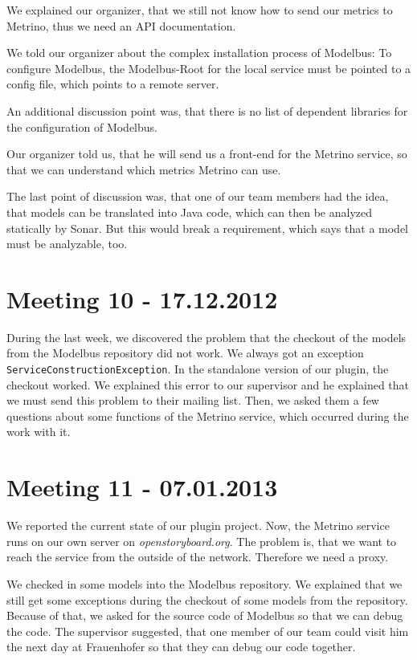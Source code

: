 We explained our organizer, that we still not know how to send our metrics to Metrino, thus we need an API documentation.

We told our organizer about the complex installation process of Modelbus: To configure Modelbus, the Modelbus-Root for the local service must be pointed to a config file, which points to a remote server.

An additional discussion point was, that there is no list of dependent libraries for the configuration of Modelbus.

Our organizer told us, that he will send us a front-end for the Metrino service, so that we can understand which metrics Metrino can use.

The last point of discussion was, that one of our team members had the idea, that models can be translated into Java code, which can then be analyzed statically by Sonar. But this would break a requirement, which says that a model must be analyzable, too.

\section{Meeting 10 - 17.12.2012}
During the last week, we discovered the problem that the checkout of the models from the Modelbus repository did not work. We always got an exception \texttt{ServiceConstructionException}. In the standalone version of our plugin, the checkout worked. We explained this error to our supervisor and he explained that we must send this problem to their mailing list. Then, we asked them a few questions about some functions of the Metrino service, which occurred during the work with it.

\section{Meeting 11 - 07.01.2013}
We reported the current state of our plugin project. Now, the Metrino service runs on our own server on \emph{openstoryboard.org}. The problem is, that we want to reach the service from the outside of the network. Therefore we need a proxy.

We checked in some models into the Modelbus repository. We explained that we still get some exceptions during the checkout of some models from the repository. Because of that, we asked for the source code of Modelbus so that we can debug the code. The supervisor suggested, that one member of our team could visit him the next day at Frauenhofer so that they can debug our code together.

